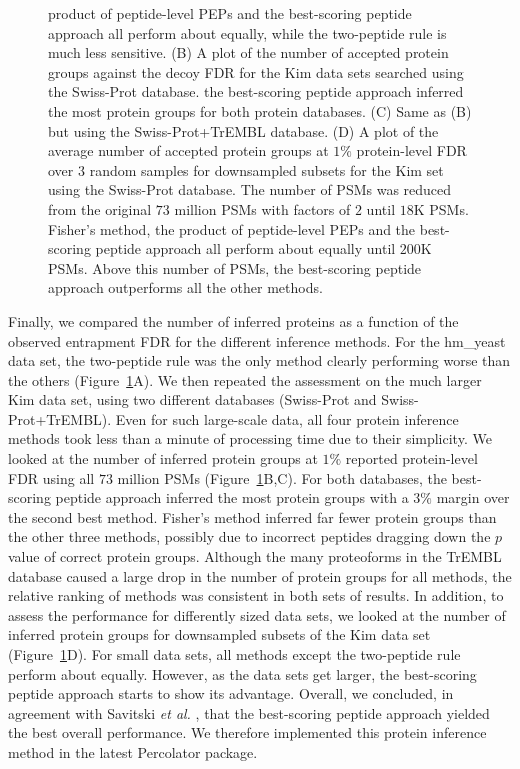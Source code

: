 \documentclass{article}
\begin{document}
\begin{figure}
{product of peptide-level PEPs and the best-scoring peptide approach
all perform about equally, while the two-peptide rule is much less
sensitive. (B) A plot of the number of accepted protein groups against
the decoy FDR for the Kim data sets searched using the Swiss-Prot
database. the best-scoring peptide approach inferred the most protein
groups for both protein databases. (C) Same as (B) but using the
Swiss-Prot+TrEMBL database. (D) A plot of the average number of
accepted protein groups at $1\%$ protein-level FDR over $3$ random
samples for downsampled subsets for the Kim set using the Swiss-Prot
database. The number of PSMs was reduced from the original $73$
million PSMs with factors of $2$ until $18$K PSMs. Fisher's method,
the product of peptide-level PEPs and the best-scoring peptide
approach all perform about equally until $200$K PSMs. Above this
number of PSMs, the best-scoring peptide approach outperforms all the
other methods.}
  \label{fig:power}
\end{figure}

Finally, we compared the number of inferred proteins as a function of
the observed entrapment FDR for the different inference methods.  For
the hm\_yeast data set, the two-peptide rule was the only method
clearly performing worse than the others (Figure~\ref{fig:power}A). We
then repeated the assessment on the much larger Kim data set, using
two different databases (Swiss-Prot and Swiss-Prot+TrEMBL).  Even for
such large-scale data, all four protein inference methods took less
than a minute of processing time due to their simplicity. We looked at
the number of inferred protein groups at $1\%$ reported protein-level
FDR using all $73$ million PSMs (Figure~\ref{fig:power}B,C).  For both
databases, the best-scoring peptide approach inferred the most protein
groups with a $3\%$ margin over the second best method. Fisher's
method inferred far fewer protein groups than the other three methods,
possibly due to incorrect peptides dragging down the $p$ value of
correct protein groups.  Although the many proteoforms in the TrEMBL
database caused a large drop in the number of protein groups for all
methods, the relative ranking of methods was consistent in both sets
of results. In addition, to assess the performance for differently
sized data sets, we looked at the number of inferred protein groups
for downsampled subsets of the Kim data set
(Figure~\ref{fig:power}D). For small data sets, all methods except the
two-peptide rule perform about equally. However, as the data sets get
larger, the best-scoring peptide approach starts to show its
advantage. Overall, we concluded, in agreement with Savitski {\em et
  al.} \cite{savitski2015scalable}, that the best-scoring peptide
approach yielded the best overall performance. We therefore
implemented this protein inference method in the latest Percolator
package.
\end{document}
